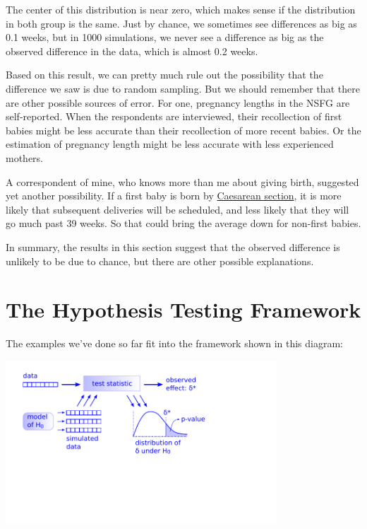The center of this distribution is near zero, which makes sense if the
distribution in both group is the same. Just by chance, we sometimes see
differences as big as 0.1 weeks, but in 1000 simulations, we never see a
difference as big as the observed difference in the data, which is
almost 0.2 weeks.

Based on this result, we can pretty much rule out the possibility that
the difference we saw is due to random sampling. But we should remember
that there are other possible sources of error. For one, pregnancy
lengths in the NSFG are self-reported. When the respondents are
interviewed, their recollection of first babies might be less accurate
than their recollection of more recent babies. Or the estimation of
pregnancy length might be less accurate with less experienced mothers.

A correspondent of mine, who knows more than me about giving birth,
suggested yet another possibility. If a first baby is born by
\href{https://en.wikipedia.org/wiki/Caesarean_section}{Caesarean
section}, it is more likely that subsequent deliveries will be
scheduled, and less likely that they will go much past 39 weeks. So that
could bring the average down for non-first babies.

In summary, the results in this section suggest that the observed
difference is unlikely to be due to chance, but there are other possible
explanations.

\hypertarget{the-hypothesis-testing-framework}{%
\section{The Hypothesis Testing
Framework}\label{the-hypothesis-testing-framework}}

The examples we've done so far fit into the framework shown in this
diagram:

\includegraphics[width=4in]{chapters/figs/hypothesis_testing.pdf}


